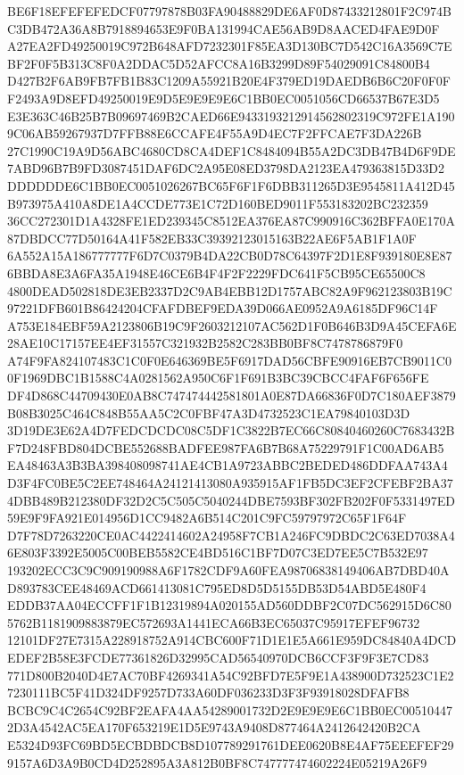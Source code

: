 \documentclass[UTF8,fontset=fandol,zihao=-4,a4paper]{ctexart}
\begin{document}
{{BE6F18EFEFEFEDCF07797878B03FA90488829DE6AF0D87433212801F2C974BC3DB472A36A8B7918894653E9F0BA131994CAE56AB9D8AACED4FAE9D0F
A27EA2FD49250019C972B648AFD7232301F85EA3D130BC7D542C16A3569C7EBF2F0F5B313C8F0A2DDAC5D52AFCC8A16B3299D89F54029091C84800B4
D427B2F6AB9FB7FB1B83C1209A55921B20E4F379ED19DAEDB6B6C20F0F0FF2493A9D8EFD49250019E9D5E9E9E9E6C1BB0EC0051056CD66537B67E3D5
E3E363C46B25B7B09697469B2CAED66E9433193212914562802319C972FE1A1909C06AB59267937D7FFB88E6CCAFE4F55A9D4EC7F2FFCAE7F3DA226B
27C1990C19A9D56ABC4680CD8CA4DEF1C8484094B55A2DC3DB47B4D6F9DE7ABD96B7B9FD3087451DAF6DC2A95E08ED3798DA2123EA479363815D33D2
DDDDDDE6C1BB0EC0051026267BC65F6F1F6DBB311265D3E9545811A412D45B973975A410A8DE1A4CCDE773E1C72D160BED9011F553183202BC232359
36CC272301D1A4328FE1ED239345C8512EA376EA87C990916C362BFFA0E170A87DBDCC77D50164A41F582EB33C39392123015163B22AE6F5AB1F1A0F
6A552A15A186777777F6D7C0379B4DA22CB0D78C64397F2D1E8F939180E8E876BBDA8E3A6FA35A1948E46CE6B4F4F2F2229FDC641F5CB95CE65500C8
4800DEAD502818DE3EB2337D2C9AB4EBB12D1757ABC82A9F962123803B19C97221DFB601B86424204CFAFDBEF9EDA39D066AE0952A9A6185DF96C14F
A753E184EBF59A2123806B19C9F2603212107AC562D1F0B646B3D9A45CEFA6E28AE10C17157EE4EF31557C321932B2582C283BB0BF8C7478786879F0
A74F9FA824107483C1C0F0E646369BE5F6917DAD56CBFE90916EB7CB9011C00F1969DBC1B1588C4A0281562A950C6F1F691B3BC39CBCC4FAF6F656FE
DF4D868C44709430E0AB8C747474442581801A0E87DA66836F0D7C180AEF3879B08B3025C464C848B55AA5C2C0FBF47A3D4732523C1EA79840103D3D
3D19DE3E62A4D7FEDCDCDC08C5DF1C3822B7EC66C80840460260C7683432BF7D248FBD804DCBE552688BADFEE987FA6B7B68A75229791F1C00AD6AB5
EA48463A3B3BA398408098741AE4CB1A9723ABBC2BEDED486DDFAA743A4D3F4FC0BE5C2EE748464A24121413080A935915AF1FB5DC3EF2CFEBF2BA37
4DBB489B212380DF32D2C5C505C5040244DBE7593BF302FB202F0F5331497ED59E9F9FA921E014956D1CC9482A6B514C201C9FC59797972C65F1F64F
D7F78D7263220CE0AC4422414602A24958F7CB1A246FC9DBDC2C63ED7038A46E803F3392E5005C00BEB5582CE4BD516C1BF7D07C3ED7EE5C7B532E97
193202ECC3C9C909190988A6F1782CDF9A60FEA98706838149406AB7DBD40AD893783CEE48469ACD661413081C795ED8D5D5155DB53D54ABD5E480F4
EDDB37AA04ECCFF1F1B12319894A020155AD560DDBF2C07DC562915D6C805762B1181909883879EC572693A1441ECA66B3EC65037C95917EFEF96732
12101DF27E7315A228918752A914CBC600F71D1E1E5A661E959DC84840A4DCDEDEF2B58E3FCDE77361826D32995CAD56540970DCB6CCF3F9F3E7CD83
771D800B2040D4E7AC70BF4269341A54C92BFD7E5F9E1A438900D732523C1E27230111BC5F41D324DF9257D733A60DF036233D3F3F93918028DFAFB8
BCBC9C4C2654C92BF2EAFA4AA54289001732D2E9E9E9E6C1BB0EC005104472D3A4542AC5EA170F653219E1D5E9743A9408D877464A2412642420B2CA
E5324D93FC69BD5ECBDBDCB8D107789291761DEE0620B8E4AF75EEEFEF299157A6D3A9B0CD4D252895A3A812B0BF8C747777474602224E05219A26F9
}}
\end{document}
